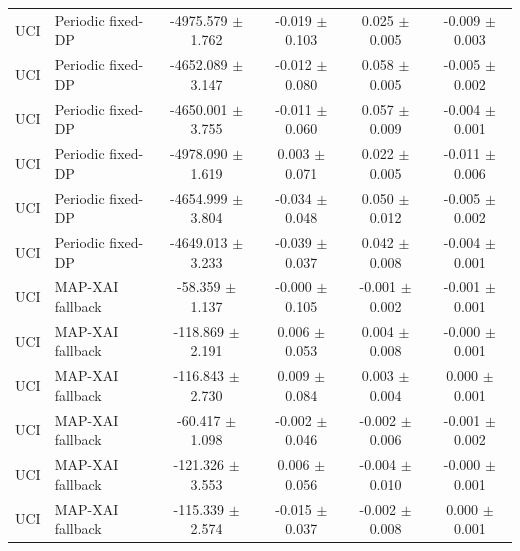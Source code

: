 \begin{table}[t]
\begin{tabular}{llcccc}
UCI & Periodic fixed-DP & -4975.579 $\pm$ 1.762 & -0.019 $\pm$ 0.103 & 0.025 $\pm$ 0.005 & -0.009 $\pm$ 0.003 \\
UCI & Periodic fixed-DP & -4652.089 $\pm$ 3.147 & -0.012 $\pm$ 0.080 & 0.058 $\pm$ 0.005 & -0.005 $\pm$ 0.002 \\
UCI & Periodic fixed-DP & -4650.001 $\pm$ 3.755 & -0.011 $\pm$ 0.060 & 0.057 $\pm$ 0.009 & -0.004 $\pm$ 0.001 \\
UCI & Periodic fixed-DP & -4978.090 $\pm$ 1.619 & 0.003 $\pm$ 0.071 & 0.022 $\pm$ 0.005 & -0.011 $\pm$ 0.006 \\
UCI & Periodic fixed-DP & -4654.999 $\pm$ 3.804 & -0.034 $\pm$ 0.048 & 0.050 $\pm$ 0.012 & -0.005 $\pm$ 0.002 \\
UCI & Periodic fixed-DP & -4649.013 $\pm$ 3.233 & -0.039 $\pm$ 0.037 & 0.042 $\pm$ 0.008 & -0.004 $\pm$ 0.001 \\
UCI & MAP-XAI fallback & -58.359 $\pm$ 1.137 & -0.000 $\pm$ 0.105 & -0.001 $\pm$ 0.002 & -0.001 $\pm$ 0.001 \\
UCI & MAP-XAI fallback & -118.869 $\pm$ 2.191 & 0.006 $\pm$ 0.053 & 0.004 $\pm$ 0.008 & -0.000 $\pm$ 0.001 \\
UCI & MAP-XAI fallback & -116.843 $\pm$ 2.730 & 0.009 $\pm$ 0.084 & 0.003 $\pm$ 0.004 & 0.000 $\pm$ 0.001 \\
UCI & MAP-XAI fallback & -60.417 $\pm$ 1.098 & -0.002 $\pm$ 0.046 & -0.002 $\pm$ 0.006 & -0.001 $\pm$ 0.002 \\
UCI & MAP-XAI fallback & -121.326 $\pm$ 3.553 & 0.006 $\pm$ 0.056 & -0.004 $\pm$ 0.010 & -0.000 $\pm$ 0.001 \\
UCI & MAP-XAI fallback & -115.339 $\pm$ 2.574 & -0.015 $\pm$ 0.037 & -0.002 $\pm$ 0.008 & 0.000 $\pm$ 0.001 \\
\bottomrule
\end{tabular}
\end{table}
